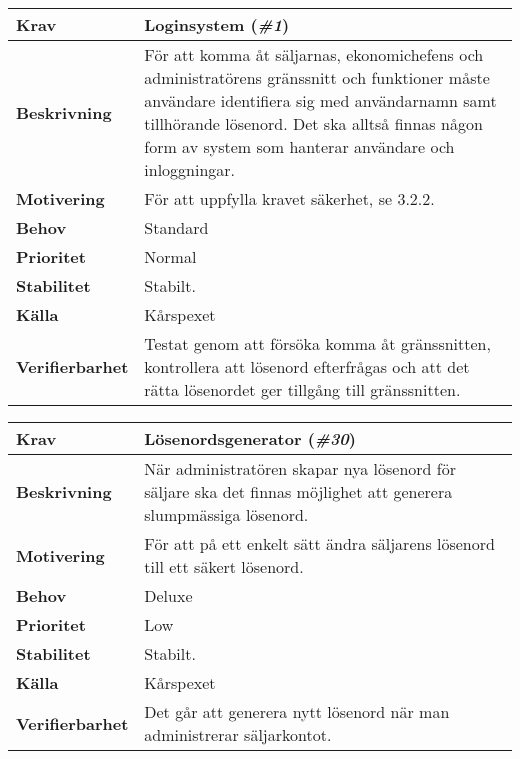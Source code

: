 \documentclass[a4paper, twoside, 11pt, titlepage]{article}
\begin{document}
		\begin{tabular} { p{2.6cm} p{12.5cm} }
			\hline
			\sffamily\textbf{Krav} & Loginsystem (\emph{\#1})  \\
			\hline
			\sffamily\textbf{Beskrivning} & För att komma åt säljarnas, ekonomichefens och administratörens gränssnitt och funktioner måste användare identifiera sig med användarnamn samt tillhörande lösenord. Det ska alltså finnas någon form av system som hanterar användare och inloggningar.  \\
			\hline
			\sffamily\textbf{Motivering} & För att uppfylla kravet säkerhet, se 3.2.2.  \\
			\hline
			\sffamily\textbf{Behov} & Standard  \\
			\hline
			\sffamily\textbf{Prioritet} & Normal  \\
			\hline
			\sffamily\textbf{Stabilitet} & Stabilt.  \\
			\hline
			\sffamily\textbf{Källa} & Kårspexet  \\
			\hline
			\sffamily\textbf{Verifierbarhet} & Testat genom att försöka komma åt gränssnitten, kontrollera att lösenord efterfrågas och att det rätta lösenordet ger tillgång till gränssnitten.  \\
			\hline
		\end{tabular}
		\vspace{6mm}

		\begin{tabular} { p{2.6cm} p{12.5cm} }
			\hline
			\sffamily\textbf{Krav} & Lösenordsgenerator (\emph{\#30})  \\
			\hline
			\sffamily\textbf{Beskrivning} & När administratören skapar nya lösenord för säljare ska det finnas möjlighet att generera slumpmässiga lösenord.  \\
			\hline
			\sffamily\textbf{Motivering} & För att på ett enkelt sätt ändra säljarens lösenord till ett säkert lösenord.  \\
			\hline
			\sffamily\textbf{Behov} & Deluxe  \\
			\hline
			\sffamily\textbf{Prioritet} & Low  \\
			\hline
			\sffamily\textbf{Stabilitet} & Stabilt.  \\
			\hline
			\sffamily\textbf{Källa} & Kårspexet  \\
			\hline
			\sffamily\textbf{Verifierbarhet} & Det går att generera nytt lösenord när man administrerar säljarkontot.  \\
			\hline
		\end{tabular}
\end{document}
